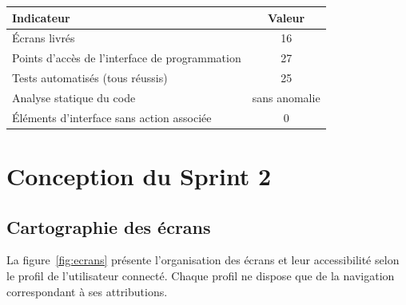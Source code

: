 \documentclass[11pt,a4paper]{article}
\begin{document}
\begin{center}
\begin{tabular}{lc}
  \toprule
  \textbf{Indicateur} & \textbf{Valeur} \\
  \midrule
  Écrans livrés & 16 \\
  Points d'accès de l'interface de programmation & 27 \\
  Tests automatisés (tous réussis) & 25 \\
  Analyse statique du code & sans anomalie \\
  Éléments d'interface sans action associée & 0 \\
  \bottomrule
\end{tabular}
\end{center}

\section{Conception du Sprint 2}

\subsection{Cartographie des écrans}
La figure~\ref{fig:ecrans} présente l'organisation des écrans et leur accessibilité selon le profil de l'utilisateur connecté. Chaque profil ne dispose que de la navigation correspondant à ses attributions.
\end{document}

